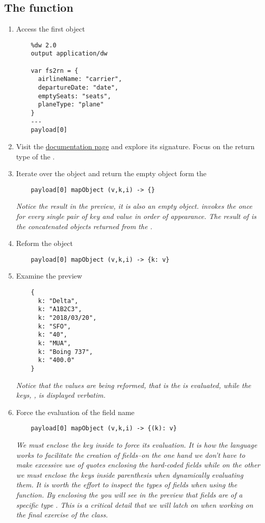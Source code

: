 \subsection{The  function}
\begin{enumerate}[resume*]
\item Access the first object
  \begin{verbatim}
    %dw 2.0
    output application/dw
    
    var fs2rn = {
      airlineName: "carrier",
      departureDate: "date",
      emptySeats: "seats",
      planeType: "plane"
    }
    ---
    payload[0]
  \end{verbatim}
\item Visit the \href{https://docs.mulesoft.com/mule-runtime/4.3/dw-core-functions-mapobject}{ documentation page} and explore its signature.  Focus on the return type of the \les{}.
\item Iterate over the object and return the empty object form the \les
  \begin{verbatim}
    payload[0] mapObject (v,k,i) -> {}
  \end{verbatim}
  \emph{
    Notice the result in the preview, it is also an empty object.   invokes the \les{} once for every single pair of key and value in order of appearance.  The result of  is the concatenated objects returned from the \les.
  }
\item Reform the object
  \begin{verbatim}
    payload[0] mapObject (v,k,i) -> {k: v}
  \end{verbatim}
\item Examine the preview
  \begin{verbatim}
    {
      k: "Delta",
      k: "A1B2C3",
      k: "2018/03/20",
      k: "SFO",
      k: "40",
      k: "MUA",
      k: "Boing 737",
      k: "400.0"
    }
  \end{verbatim}
  \emph{
    Notice that the values are being reformed, that is the  is evaluated, while the keys, , is displayed verbatim.
  }
\item Force the evaluation of the field name
  \begin{verbatim}
    payload[0] mapObject (v,k,i) -> {(k): v}
  \end{verbatim}
  \emph{
    We must enclose the key inside \ttt{()} to force its evaluation.  It is how the language works to facilitate the creation of fields--on the one hand we don't have to make excessive use of quotes enclosing the hard-coded fields while on the other we must enclose the keys inside parenthesis when dynamically evaluating them.
  }
  \newline
  \emph{
    It is worth the effort to inspect the types of fields when using the  function.  By enclosing the  you will see in the preview that fields are of a specific type .  This is a critical detail that we will latch on when working on the final exercise of the class. 
  }
\end{enumerate}

